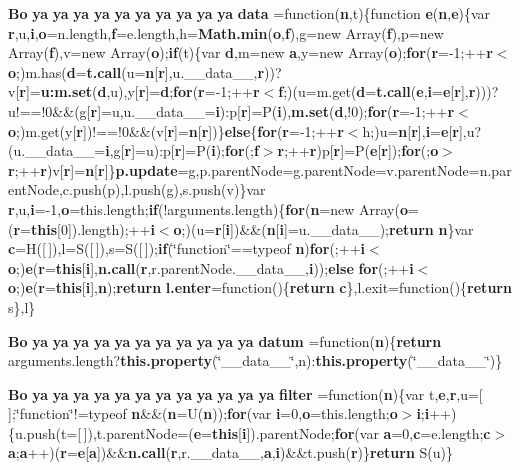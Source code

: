\begin{DoxyCompactItemize}
{\bf Bo} {\bf ya} {\bf ya} {\bf ya} {\bf ya} {\bf ya} {\bf ya} {\bf ya} {\bf ya} {\bf ya} {\bf ya} {\bf data} =function({\bf n},t)\{function {\bf e}({\bf n},{\bf e})\{var {\bf r},u,{\bf i},{\bf o}=n.\+length,{\bf f}=e.\+length,h={\bf Math.\+min}({\bf o},{\bf f}),g=new Array({\bf f}),p=new Array({\bf f}),v=new Array({\bf o});{\bf if}(t)\{var {\bf d},m=new {\bf a},y=new Array({\bf o});{\bf for}({\bf r}=-\/1;++{\bf r}$<${\bf o};)m.\+has({\bf d}={\bf t.\+call}(u={\bf n}[{\bf r}],u.\+\_\+\+\_\+data\+\_\+\+\_\+,{\bf r}))?v[{\bf r}]={\bf u\+:m.\+set}({\bf d},u),y[{\bf r}]={\bf d};{\bf for}({\bf r}=-\/1;++{\bf r}$<${\bf f};)(u=m.\+get({\bf d}={\bf t.\+call}({\bf e},{\bf i}={\bf e}[{\bf r}],{\bf r})))?u!==!0\&\&(g[{\bf r}]=u,u.\+\_\+\+\_\+data\+\_\+\+\_\+={\bf i})\+:p[{\bf r}]=P({\bf i}),{\bf m.\+set}({\bf d},!0);{\bf for}({\bf r}=-\/1;++{\bf r}$<${\bf o};)m.\+get(y[{\bf r}])!==!0\&\&(v[{\bf r}]={\bf n}[{\bf r}])\}{\bf else}\{{\bf for}({\bf r}=-\/1;++{\bf r}$<$h;)u={\bf n}[{\bf r}],{\bf i}={\bf e}[{\bf r}],u?(u.\+\_\+\+\_\+data\+\_\+\+\_\+={\bf i},g[{\bf r}]=u)\+:p[{\bf r}]=P({\bf i});{\bf for}(;{\bf f}$>${\bf r};++{\bf r})p[{\bf r}]=P({\bf e}[{\bf r}]);{\bf for}(;{\bf o}$>${\bf r};++{\bf r})v[{\bf r}]={\bf n}[{\bf r}]\}{\bf p.\+update}=g,p.\+parent\+Node=g.\+parent\+Node=v.\+parent\+Node=n.\+parent\+Node,c.\+push(p),l.\+push(g),s.\+push(v)\}var {\bf r},u,{\bf i}=-\/1,{\bf o}=this.\+length;{\bf if}(!arguments.\+length)\{{\bf for}({\bf n}=new Array({\bf o}=({\bf r}={\bf this}[0]).length);++{\bf i}$<${\bf o};)(u={\bf r}[{\bf i}])\&\&({\bf n}[{\bf i}]=u.\+\_\+\+\_\+data\+\_\+\+\_\+);{\bf return} {\bf n}\}var {\bf c}=H([$\,$]),l=S([$\,$]),s=S([$\,$]);{\bf if}(\char`\"{}function\char`\"{}==typeof {\bf n}){\bf for}(;++{\bf i}$<${\bf o};){\bf e}({\bf r}={\bf this}[{\bf i}],{\bf n.\+call}({\bf r},r.\+parent\+Node.\+\_\+\+\_\+data\+\_\+\+\_\+,{\bf i}));{\bf else} {\bf for}(;++{\bf i}$<${\bf o};){\bf e}({\bf r}={\bf this}[{\bf i}],{\bf n});{\bf return} {\bf l.\+enter}=function()\{{\bf return} {\bf c}\},l.\+exit=function()\{{\bf return} s\},l\}
\item 
{\bf Bo} {\bf ya} {\bf ya} {\bf ya} {\bf ya} {\bf ya} {\bf ya} {\bf ya} {\bf ya} {\bf ya} {\bf ya} {\bf ya} {\bf datum} =function({\bf n})\{{\bf return} arguments.\+length?{\bf this.\+property}(\char`\"{}\+\_\+\+\_\+data\+\_\+\+\_\+\char`\"{},n)\+:{\bf this.\+property}(\char`\"{}\+\_\+\+\_\+data\+\_\+\+\_\+\char`\"{})\}
\item 
{\bf Bo} {\bf ya} {\bf ya} {\bf ya} {\bf ya} {\bf ya} {\bf ya} {\bf ya} {\bf ya} {\bf ya} {\bf ya} {\bf ya} {\bf ya} {\bf filter} =function({\bf n})\{var t,{\bf e},{\bf r},u=[$\,$];\char`\"{}function\char`\"{}!=typeof {\bf n}\&\&({\bf n}=U({\bf n}));{\bf for}(var {\bf i}=0,{\bf o}=this.\+length;{\bf o}$>${\bf i};{\bf i}++)\{u.\+push(t=[$\,$]),t.\+parent\+Node=({\bf e}={\bf this}[{\bf i}]).parent\+Node;{\bf for}(var {\bf a}=0,{\bf c}=e.\+length;{\bf c}$>${\bf a};{\bf a}++)({\bf r}={\bf e}[{\bf a}])\&\&{\bf n.\+call}({\bf r},r.\+\_\+\+\_\+data\+\_\+\+\_\+,{\bf a},{\bf i})\&\&t.\+push({\bf r})\}{\bf return} S(u)\}

\end{DoxyCompactItemize}
